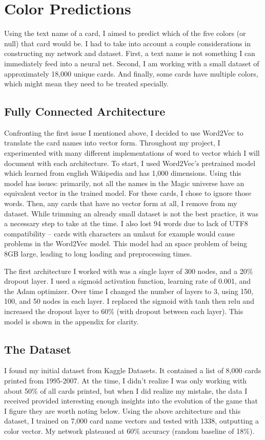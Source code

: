 \section{Color Predictions}
\label{sec:color_predicts}

Using the text name of a card, I aimed to predict
which of the five colors (or null) that card would be.
I had to take into account a couple considerations in
constructing my network and dataset. First, a text name
is not something I can immediately feed into a neural net.
Second, I am working with a small dataset of approximately
18,000 unique cards. And finally, some cards have multiple
colors, which might mean they need to be treated specially.

\subsection{Fully Connected Architecture}
Confronting the first issue I mentioned above, I decided to use 
Word2Vec to translate the card names into vector form. Throughout
my project, I experimented with many different implementations of 
word to vector which I will document with each architecture. To start,
I used Word2Vec's pretrained model which learned from english Wikipedia
and has 1,000 dimensions\cite{deeplearning4j}. Using this model has issues:
primarily, not all the names in the Magic universe have an equivalent 
vector in the trained model. For these cards, I chose to ignore those words.
Then, any cards that have no vector form at all, I remove from my dataset.
While trimming an already small dataset is not the best practice, it was a
necessary step to take at the time. I also lost 94 words due to lack of UTF8
compatibility -- cards with characters an umlaut for example would cause problems
in the Word2Vec model. This model had an space problem of being
8GB large, leading to long loading and preprocessing times.

The first architecture I worked with was a single layer of
300 nodes, and a 20\% dropout layer. I used a sigmoid activation
function, learning rate of 0.001, and the Adam optimizer. Over time
I changed the number of layers to 3, using 150, 100, and 50 nodes in
each layer. I replaced the sigmoid with tanh then relu and increased
the dropout layer to 60\% (with dropout between each layer). This model
is shown in the appendix for clarity.

\subsection{The Dataset}
I found my initial dataset from Kaggle Datasets. It contained
a list of 8,000 cards printed from 1995-2007. At the time, I
didn't realize I was only working with about 50\% of all cards
printed, but when I did realize my mistake, the data I received 
provided interesting enough insights into the evolution of the game 
that I figure they are worth noting below.
Using the above architecture and this dataset, I trained on 7,000 card name 
vectors and tested with 1338, outputting a color vector. My network 
plateaued at 60\% accuracy (random baseline of 18\%).

